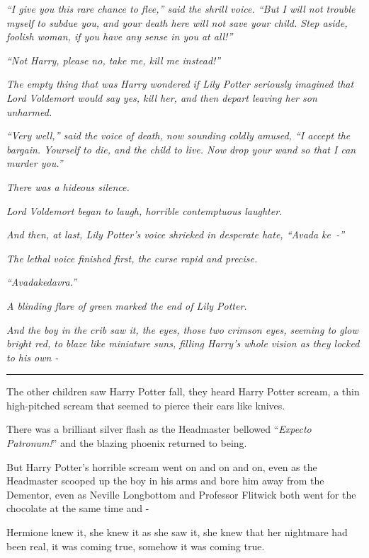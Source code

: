 \emph{``I give you this rare chance to flee,'' said the shrill voice. ``But I will not trouble myself to subdue you, and your death here will not save your child. Step aside, foolish woman, if you have any sense in you at all!''}

\emph{``Not Harry, please no, take me, kill me instead!''}

\emph{The empty thing that was Harry wondered if Lily Potter seriously imagined that Lord Voldemort would say yes, kill her, and then depart leaving her son unharmed.}

\emph{``Very well,'' said the voice of death, now sounding coldly amused, ``I accept the bargain. Yourself to die, and the child to live. Now drop your wand so that I can murder you.''}

\emph{There was a hideous silence.}

\emph{Lord Voldemort began to laugh, horrible contemptuous laughter.}

\emph{And then, at last, Lily Potter's voice shrieked in desperate hate, ``Avada ke~-''}

\emph{The lethal voice finished first, the curse rapid and precise.}

\emph{``Avadakedavra.''}

\emph{A blinding flare of green marked the end of Lily Potter.}

\emph{And the boy in the crib saw it, the eyes, those two crimson eyes, seeming to glow bright red, to blaze like miniature suns, filling Harry's whole vision as they locked to his own -}

\begin{center}\rule{3in}{0.4pt}\end{center}

The other children saw Harry Potter fall, they heard Harry Potter scream, a thin high-pitched scream that seemed to pierce their ears like knives.

There was a brilliant silver flash as the Headmaster bellowed ``\emph{Expecto Patronum!}'' and the blazing phoenix returned to being.

But Harry Potter's horrible scream went on and on and on, even as the Headmaster scooped up the boy in his arms and bore him away from the Dementor, even as Neville Longbottom and Professor Flitwick both went for the chocolate at the same time and -

Hermione knew it, she knew it as she saw it, she knew that her nightmare had been real, it was coming true, somehow it was coming true.

